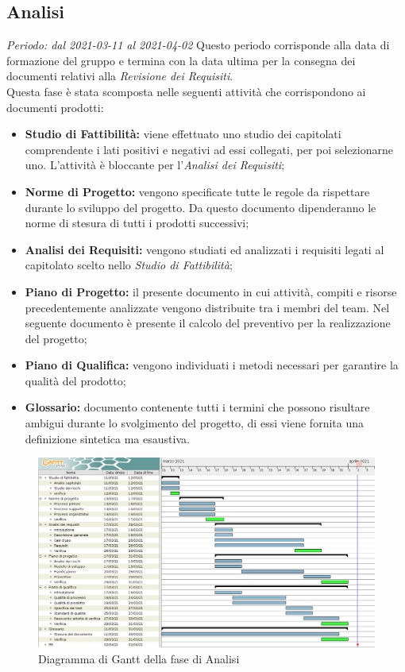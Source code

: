     \subsection{Analisi}
        \textit{Periodo: dal 2021-03-11 al 2021-04-02}
        Questo periodo corrisponde alla data di formazione del gruppo e termina con la data ultima per la consegna dei documenti relativi alla \textit{Revisione dei Requisiti}.\\
        Questa fase è stata scomposta nelle seguenti attività che corrispondono ai documenti prodotti:
        \begin {itemize}
            \item \textbf{Studio di Fattibilità:} viene effettuato uno studio dei capitolati comprendente i lati positivi e negativi ad essi collegati, per poi selezionarne uno. L'attività è bloccante per l'\textit{Analisi dei Requisiti};
            \item \textbf{Norme di Progetto:} vengono specificate tutte le regole da rispettare durante lo sviluppo del progetto. Da questo documento dipenderanno le norme di stesura di tutti i prodotti successivi;
            \item \textbf{Analisi dei Requisiti:} vengono studiati ed analizzati i requisiti legati al capitolato scelto nello \textit{Studio di Fattibilità};
            \item \textbf{Piano di Progetto:} il presente documento in cui attività, compiti e risorse precedentemente analizzate vengono distribuite tra i membri del team. Nel seguente documento è presente il calcolo del preventivo per la realizzazione del progetto;
            \item \textbf{Piano di Qualifica:} vengono individuati i metodi necessari per garantire la qualità del prodotto;
            \item \textbf{Glossario:} documento contenente tutti i termini che possono risultare ambigui durante lo svolgimento del progetto, di essi viene fornita una definizione sintetica ma esaustiva.
        \end {itemize}
        \begin{figure}[!ht]
            \caption{Diagramma di Gantt della fase di Analisi}
            \vspace{5px}
            \includegraphics[scale=0.21]{../../../Images/Diagrammi/Gantt/diagramma_gantt_analisi_0.2.png}
            \centering
        \end{figure}


